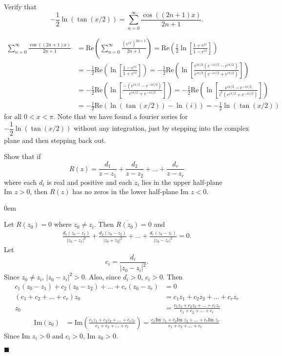 \documentclass[12pt]{article}
\author{Warren Atkison}
\date{\today}
\renewcommand{\qed}{\hfill$\blacksquare$}
\renewenvironment{proof}{\vspace{1em}\begin{addmargin}[2em]{0em}\begin{newproof}}{\end{newproof}\end{addmargin}\qed}
\newenvironment{exercise}[2][Exercise]{\begin{trivlist}
\item[\hskip \labelsep {\bfseries #1} \hskip \labelsep {\bfseries #2.}]}{\end{trivlist}}
\newenvironment{problem}[2][Problem]{\begin{trivlist}
\item[\hskip \labelsep {\bfseries #1} \hskip \labelsep {\bfseries #2.}]}{\end{trivlist}}
\begin{document}
\fancyhf{}
\fancyhead[R]{\today}
\fancyfoot[R]{\thepage}

\begin{problem}{1}
	Verify that
	\[
		-\frac{1}{2}\ln(\tan(x/2)) = \sum_{n=0}^{\infty} \frac{\cos((2n + 1)x)}{2n+1}.
	\]
\end{problem}
\begin{align*}
	\sum_{n=0}^{\infty} \frac{\cos((2n + 1)x)}{2n + 1} &= \text{Re}\left(\sum_{n=0}^{\infty} \frac{(e^{ix})^{2n + 1}}{2n+1}\right) = \text{Re}\left(\frac{1}{2}\ln\left[\frac{1 + e^{ix}}{1 - e^{ix}}\right]\right) \\
							   &= -\frac{1}{2}\text{Re}\left(\ln\left[\frac{1 - e^{ix}}{1 + e^{ix}}\right]\right) = -\frac{1}{2}\text{Re}\left(\ln\left[\frac{e^{ix/2}(e^{-ix/2} - e^{ix/2})}{e^{ix/2}(e^{-ix/2} + e^{ix/2})}\right]\right) \\
							   &= -\frac{1}{2}\text{Re}\left(\ln\left[\frac{-(e^{ix/2} - e^{-ix/2})}{e^{ix/2} + e^{-ix/2}}\right]\right) = -\frac{1}{2}\text{Re}\left(\ln\left[\frac{e^{ix/2} - e^{-ix/2}}{i^2(e^{ix/2} + e^{-ix/2})}\right]\right) \\
							   &= -\frac{1}{2}\text{Re}\left(\ln(\tan(x/2)) - \ln(i)\right) = -\frac{1}{2}\ln(\tan(x/2))
\end{align*}
for all $0< x < \pi$. Note that we have found a fourier series for $-\dfrac{1}{2}\ln(\tan(x/2))$ without any integration, just by stepping into the complex plane and then stepping back out.
\begin{exercise}{3.1.18}
	Show that if
	\[
		R(z) = \frac{d_1}{z - z_1} + \frac{d_2}{z - z_2} + \ldots + \frac{d_r}{z - z_r}
	\]
	where each $d_i$ is real and positive and each $z_i$ lies in the upper half-plane $\text{Im } z > 0$, then $R(z)$ has no zeros in the lower half-plane $\text{Im } z < 0$.
\begin{proof}
	Let $R(z_0) = 0$ where $z_0 \neq z_i$. Then $\overline{R(z_0)} = 0$ and
	\begin{align*}
		\frac{d_1(z_0 - z_1)}{|z_0 - z_1|^2} + \frac{d_2(z_0 - z_2)}{|z_0 + z_2|^2} + \ldots + \frac{d_r(z_0 - z_r)}{|z_0 - z_r|^2} = 0.
	\end{align*}
	Let
	\[
		c_i = \frac{d_i}{|z_0 - z_i|^2}.
	\]
	Since $z_0 \neq z_i$, $|z_0 - z_i|^2 > 0$. Also, since $d_i > 0$, $c_i > 0$. Then
	\begin{align*}
		c_1(z_0 - z_1) + c_2(z_0 - z_2) + \ldots + c_r(z_0 - z_r) &= 0 \\
		(c_1 + c_2 + \ldots + c_r)z_0 &= c_1z_1 + c_2z_2 + \ldots + c_rz_r \\
		z_0 &= \frac{c_1z_1 + c_2z_2 + \ldots + c_rz_r}{c_1 + c_2 + \ldots + c_r}
	\end{align*}
	\begin{align*}
		\text{Im}(z_0) &= \text{Im}\left(\frac{c_1z_1 + c_2z_2 + \ldots + c_rz_r}{c_1 + c_2 + \ldots + c_r}
\right) = \frac{c_1\text{Im } z_1 + c_2\text{Im } z_2 + \ldots + c_r\text{Im } z_r}{c_1 + c_2 + \ldots + c_r}
	\end{align*}
	Since $\text{Im } z_i > 0$ and $c_i >0$, $\text{Im } z_0 > 0$.
\end{proof}
\end{exercise}	
\end{document}

